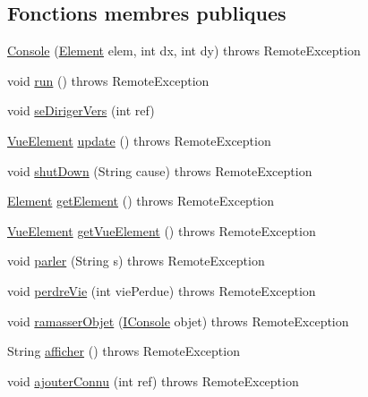 \subsection*{Fonctions membres publiques}
\begin{DoxyCompactItemize}
\item 
\hyperlink{classcontrole_1_1_console_a35af1c179b641b9afee8647567668b58}{Console} (\hyperlink{classindividu_1_1_element}{Element} elem, int dx, int dy)  throws Remote\-Exception 
\item 
void \hyperlink{classcontrole_1_1_console_a152371882b9665bde857d76438d70d02}{run} ()  throws Remote\-Exception 
\item 
void \hyperlink{classcontrole_1_1_console_aec0965feae069d1376b6ab0996767be8}{se\-Diriger\-Vers} (int ref)
\item 
\hyperlink{classinterface_graphique_1_1_vue_element}{Vue\-Element} \hyperlink{classcontrole_1_1_console_a67a69e366628189229f757915169de2e}{update} ()  throws Remote\-Exception 
\item 
void \hyperlink{classcontrole_1_1_console_a59029e1a06e0276d7ef75ba69bd0c16b}{shut\-Down} (String cause)  throws Remote\-Exception 
\item 
\hyperlink{classindividu_1_1_element}{Element} \hyperlink{classcontrole_1_1_console_abfbaec728b66178c064fd56ded8ece87}{get\-Element} ()  throws Remote\-Exception 
\item 
\hyperlink{classinterface_graphique_1_1_vue_element}{Vue\-Element} \hyperlink{classcontrole_1_1_console_ad1573e5279879abd84a460ffb080fdf3}{get\-Vue\-Element} ()  throws Remote\-Exception 
\item 
void \hyperlink{classcontrole_1_1_console_ad7157537fa92a47ed06563586dba5e2d}{parler} (String s)  throws Remote\-Exception 
\item 
void \hyperlink{classcontrole_1_1_console_a046b6d6c18e8bbecad7a4ff4e2c35a8f}{perdre\-Vie} (int vie\-Perdue)  throws Remote\-Exception 
\item 
void \hyperlink{classcontrole_1_1_console_aaa5374f35b30f5c232aac22041801c38}{ramasser\-Objet} (\hyperlink{interfacecontrole_1_1_i_console}{I\-Console} objet)  throws Remote\-Exception 
\item 
String \hyperlink{classcontrole_1_1_console_a750f2122aee6e608375f999cdfa5f43b}{afficher} ()  throws Remote\-Exception 
\item 
void \hyperlink{classcontrole_1_1_console_aae7e697a8bc845c11c1430c08edd6b8c}{ajouter\-Connu} (int ref)  throws Remote\-Exception 
\end{DoxyCompactItemize}


